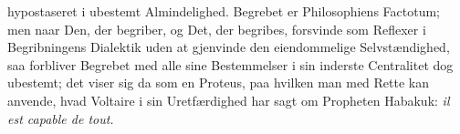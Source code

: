 \documentclass[12pt]{book}
\begin{document}
hypostaseret i ubestemt Almindelighed. Begrebet er Philosophiens Factotum; men naar Den,
der begriber, og Det, der begribes, forsvinde som Reflexer i Begribningens Dialektik uden
at gjenvinde den eiendommelige Selvstændighed, saa forbliver Begrebet med alle sine
Bestemmelser i sin inderste Centralitet dog ubestemt; det viser sig da som en Proteus,
paa hvilken man med Rette kan anvende, hvad Voltaire i sin Uretfærdighed har sagt om
Propheten Habakuk: \textit{il est capable de tout.}
\end{document}
